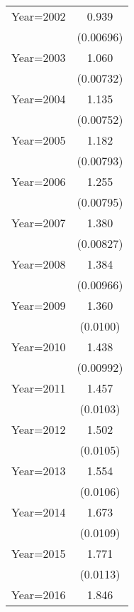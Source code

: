 {\begin{longtable}{l*{1}{c}}
\addlinespace
Year=2002           &       0.939\sym{***}\\
                    &   (0.00696)         \\
\addlinespace
Year=2003           &       1.060\sym{***}\\
                    &   (0.00732)         \\
\addlinespace
Year=2004           &       1.135\sym{***}\\
                    &   (0.00752)         \\
\addlinespace
Year=2005           &       1.182\sym{***}\\
                    &   (0.00793)         \\
\addlinespace
Year=2006           &       1.255\sym{***}\\
                    &   (0.00795)         \\
\addlinespace
Year=2007           &       1.380\sym{***}\\
                    &   (0.00827)         \\
\addlinespace
Year=2008           &       1.384\sym{***}\\
                    &   (0.00966)         \\
\addlinespace
Year=2009           &       1.360\sym{***}\\
                    &    (0.0100)         \\
\addlinespace
Year=2010           &       1.438\sym{***}\\
                    &   (0.00992)         \\
\addlinespace
Year=2011           &       1.457\sym{***}\\
                    &    (0.0103)         \\
\addlinespace
Year=2012           &       1.502\sym{***}\\
                    &    (0.0105)         \\
\addlinespace
Year=2013           &       1.554\sym{***}\\
                    &    (0.0106)         \\
\addlinespace
Year=2014           &       1.673\sym{***}\\
                    &    (0.0109)         \\
\addlinespace
Year=2015           &       1.771\sym{***}\\
                    &    (0.0113)         \\
\addlinespace
Year=2016           &       1.846\sym{***}\\

\end{longtable}}
